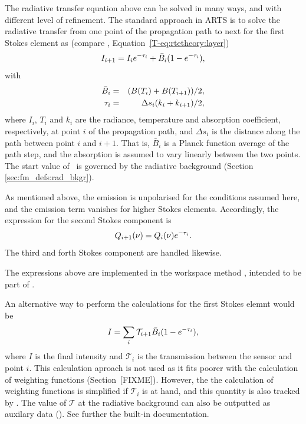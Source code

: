 The radiative transfer equation above can be solved in many ways, and with
different level of refinement. The standard approach in ARTS is to solve the
radiative transfer from one point of the propagation path to next for the first
Stokes element as (compare \theory, Equation~\ref{T-eq:rtetheory:layer})
\begin{equation}
  \label{eq:fm_defs:rte_step}
  I_{i+1} = I_ie^{-\tau_{i}} + \bar{B}_i(1-e^{-\tau_{i}}),
\end{equation}
with
\begin{eqnarray}
  \bar{B}_i &=& (B(T_i)+B(T_{i+1}))/2, \\
  \tau_{i} &=& \Delta s_i(k_i+k_{i+1})/2, 
  \label{eq:taustep}
\end{eqnarray}
where $I_i$, $T_i$ and $k_i$ are the radiance, temperature and absorption
coefficient, respectively, at point $i$ of the propagation path, and $\Delta
s_i$ is the distance along the path between point $i$ and $i+1$. That is,
$\bar{B}_i$ is a Planck function average of the path step, and the absorption
is assumed to vary linearly between the two points. The start value of \Mpi\ is
governed by the radiative background (Section \ref{sec:fm_defs:rad_bkgr}).

As mentioned above, the emission is unpolarised for the conditions assumed
here, and the emission term vanishes for higher Stokes elements. Accordingly,
the expression for the second Stokes component is
\begin{equation}
  Q_{i+1}(\nu) = Q_i(\nu)e^{-\tau_{i}}.
  \label{eq:fm_defs:rte_step2}
\end{equation}
The third and forth Stokes component are handled likewise.

The expressions above are implemented in the workspace method
, intended to be part of
. 

An alternative way to perform the calculations for the first Stokes elemnt
would be
\begin{equation}
  \label{eq:fm_defs:rte_alt}
  I = \sum_i \mathcal{T}_{i+1} \bar{B}_i(1-e^{-\tau_{i}}),
\end{equation}
where $I$ is the final intensity and $\mathcal{T}_i$ is the transmission
between the sensor and point $i$. This calculation aproach is not used as it
fits poorer with the calculation of weighting functions (Section~[FIXME]).
However, the the calculation of weighting functions is simplified if
$\mathcal{T}_i$ is at hand, and this quantity is also tracked by
. The value of $\mathcal{T}$ at the
radiative background can also be outputted as auxilary data
(). See further the built-in documentation.

